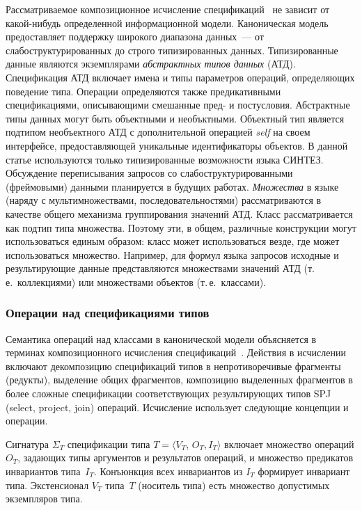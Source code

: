 \begin{multicols}{2}
Рас\-смат\-ри\-ва\-емое композиционное исчисление
спецификаций~\cite{Kla99} не зависит от ка\-кой-ни\-будь определенной информационной
модели. Кано\-ническая модель~\cite{KlaStu07} предоставляет поддержку широ\-ко\-го
диапазона данных~--- от слабоструктурированных до строго типизированных данных. %
Типизированные данные являются экземплярами \textit{абстрактных типов
данных} (АТД). Спецификация АТД включает  имена и типы параметров операций,
определяющих поведение типа. Операции определяются также предикативными
спецификациями, описывающими  смешанные пред- и постусловия. Абстрактные типы
данных могут быть объектными и необъктными. Объектный тип является подтипом
необъектного АТД с дополнительной операцией \textit{self} на своем интерфейсе,
предоставляющей уникальные идентификаторы объектов. В данной статье
используются только типизированные возможности языка СИНТЕЗ. Обсуждение
переписывания запросов со слабоструктурированными (фреймовыми) данными
планируется в будущих работах. \textit{Множества} в языке (наряду с
мультимножествами, последовательностями) рассматриваются в качестве общего
механизма группирования значений АТД. Класс рассматривается как подтип типа
множества. Поэтому эти, в общем, различные конструкции могут использоваться единым
образом: класс может использоваться везде, где может использоваться множество.
Например, для формул языка запросов исходные и результирующие данные
представляются множествами значений АТД (т.\,е.\ коллекциями) или множествами
объектов (т.\,е.\ классами).

\subsubsection{Операции над спецификациями типов}

Семантика операций над классами в канонической модели объясняется в терминах
композиционного исчисления спецификаций~\cite{Kla99}. Действия в исчислении
включают декомпозицию спецификаций типов в непротиворечивые фрагменты (редукты),
выделение общих фрагментов, композицию выделенных фрагментов в более сложные
спецификации соответствующих результирующих типов SPJ (select, project,
join) операций. Исчисление использует следующие концепции и операции.

     Сигнатура $\Sigma_T$ спецификации типа $T=\langle V_T$, %
$O_T, I_T\rangle$ включает
множество операций $O_T$, задающих типы аргументов и результатов операций, и
множество предикатов инвариантов типа~$I_T$. Конъюнкция всех инвариантов из $I_T$
формирует инвариант типа. Экстенсионал $V_T$ типа~$T$ (носитель типа) есть
множество допустимых экземпляров типа.


\end{multicols}
